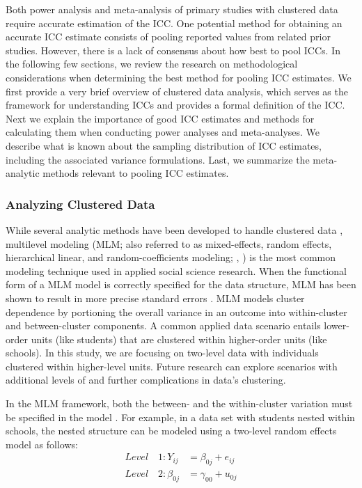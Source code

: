 Both power analysis and meta-analysis of primary studies with clustered data require accurate estimation of the ICC. One potential method for obtaining an accurate ICC estimate consists of pooling reported values from related prior studies. However, there is a lack of consensus about how best to pool ICCs. In the following few sections, we review the research on methodological considerations when determining the best method for pooling ICC estimates. We first provide a very brief overview of clustered data analysis, which serves as the framework for understanding ICCs and provides a formal definition of the ICC. 
Next we explain the importance of good ICC estimates and methods for calculating them when conducting power analyses and meta-analyses. We describe what is known about the sampling distribution of ICC estimates, including the associated variance formulations. Last, we summarize the meta-analytic methods relevant to pooling ICC estimates. 


\subsubsection{Analyzing Clustered Data}
While several analytic methods have been developed to handle clustered data \cite{donner1980, LIANGKUNG-YEE1986Ldau, mcneish2019}, multilevel modeling (MLM; also referred to as mixed-effects, random effects, hierarchical linear, and random-coefficients modeling; , ) is the most common modeling technique used in applied social science research. When the functional form of a MLM model is correctly specified for the data structure, MLM has been shown to result in more precise standard errors \cite{mcneish2019}. MLM models cluster dependence by portioning the overall variance in an outcome into within-cluster and between-cluster components. A common applied data scenario entails lower-order units (like students) that are clustered within higher-order units (like schools). In this study, we are focusing on two-level data with individuals clustered within higher-level units. Future research can explore scenarios with additional levels of and further complications in data's clustering. 

In the MLM framework, both the between- and the within-cluster variation must be specified in the model \cite{raudenbushHierarchicalLinearModels2002}. For example, in a data set with students nested within schools, the nested structure can be modeled using a two-level random effects model as follows:
\begin{equation}\label{twolevel}
    \begin{split}
    Level \quad 1: Y_{ij} &= \beta_{0j} + e_{ij} \\
    Level \quad 2: \beta_{0j} &= \gamma_{00} + u_{0j}
    \end{split} 
\end{equation}
    
